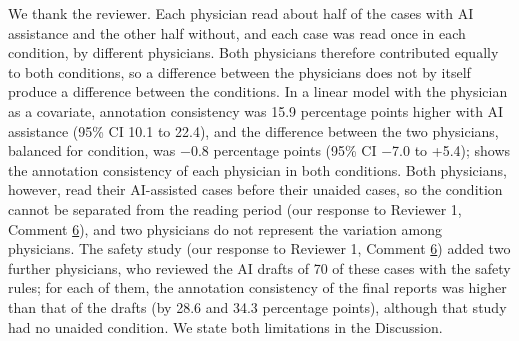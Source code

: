 We thank the reviewer. Each physician read about half of the cases with AI assistance and the other half without, and each case was read once in each condition, by different physicians. Both physicians therefore contributed equally to both conditions, so a difference between the physicians does not by itself produce a difference between the conditions. In a linear model with the physician as a covariate, annotation consistency was 15.9 percentage points higher with AI assistance (95\% CI 10.1 to 22.4), and the difference between the two physicians, balanced for condition, was $-$0.8 percentage points (95\% CI $-$7.0 to +5.4);  shows the annotation consistency of each physician in both conditions. Both physicians, however, read their AI-assisted cases before their unaided cases, so the condition cannot be separated from the reading period (our response to Reviewer 1, Comment \hyperref[rev:R1.6]{6}), and two physicians do not represent the variation among physicians. The safety study (our response to Reviewer 1, Comment \hyperref[rev:R1.6]{6}) added two further physicians, who reviewed the AI drafts of 70 of these cases with the safety rules; for each of them, the annotation consistency of the final reports was higher than that of the drafts (by 28.6 and 34.3 percentage points), although that study had no unaided condition. We state both limitations in the Discussion.\par
